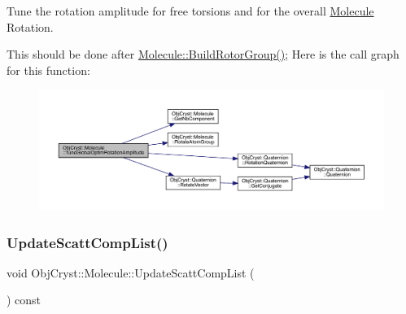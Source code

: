 Tune the rotation amplitude for free torsions and for the overall \mbox{\hyperlink{class_obj_cryst_1_1_molecule}{Molecule}} Rotation.

This should be done after \mbox{\hyperlink{class_obj_cryst_1_1_molecule_a3642fa8104faa1ce84a977600f9d1aeb}{Molecule\+::\+Build\+Rotor\+Group()}}; Here is the call graph for this function\+:
\nopagebreak
\begin{figure}[H]
\begin{center}
\leavevmode
\includegraphics[width=350pt]{class_obj_cryst_1_1_molecule_a9cc198b9cb896d28c7bd90a775db4ec2_cgraph}
\end{center}
\end{figure}
\mbox{\label{class_obj_cryst_1_1_molecule_a53e8b1249d2f489fd71f06612cde0bd4}} 
\subsubsection{\texorpdfstring{UpdateScattCompList()}{UpdateScattCompList()}}
{\footnotesize\ttfamily void Obj\+Cryst\+::\+Molecule\+::\+Update\+Scatt\+Comp\+List (\begin{DoxyParamCaption}{ }\end{DoxyParamCaption}) const}

